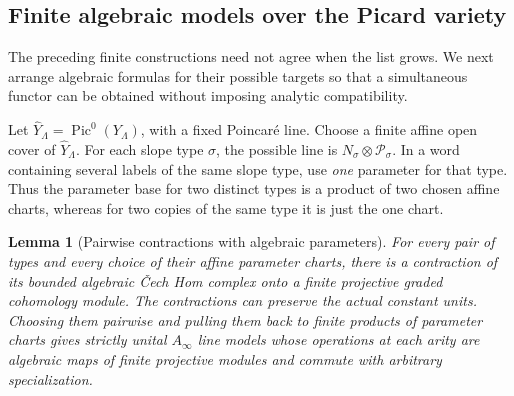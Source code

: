 \documentclass[11pt]{article}
\newtheorem{lemma}[theorem]{Lemma}
\theoremstyle{definition}
\theoremstyle{remark}
\numberwithin{equation}{section}
\begin{document}
\subsection{Finite algebraic models over the Picard variety}

The preceding finite constructions need not agree when the list
grows.  We next arrange algebraic formulas for their possible targets
so that a simultaneous functor can be obtained without imposing
analytic compatibility.

Let $\widehat Y_\Lambda=\operatorname{Pic}^0(Y_\Lambda)$, with a fixed Poincar\'e
line.  Choose a finite affine open cover of $\widehat Y_\Lambda$.
For each slope type $\sigma$, the possible line is
$N_\sigma\otimes\mathcal P_\sigma$.  In a word containing several
labels of the same slope type, use \emph{one} parameter for that type.
Thus the parameter base for two distinct types is a product of two
chosen affine charts, whereas for two copies of the same type it is
just the one chart.

\begin{lemma}[Pairwise contractions with algebraic parameters]
\label{mirror:parameter-model}
For every pair of types and every choice of their affine parameter
charts, there is a contraction of its bounded algebraic \v Cech Hom
complex onto a finite projective graded cohomology module.  The
contractions can preserve the actual constant units.  Choosing them
pairwise and pulling them back to finite products of parameter
charts gives strictly unital $A_\infty$ line models whose operations at
each arity are algebraic maps of finite projective modules and
commute with arbitrary specialization.
\end{lemma}
\end{document}
